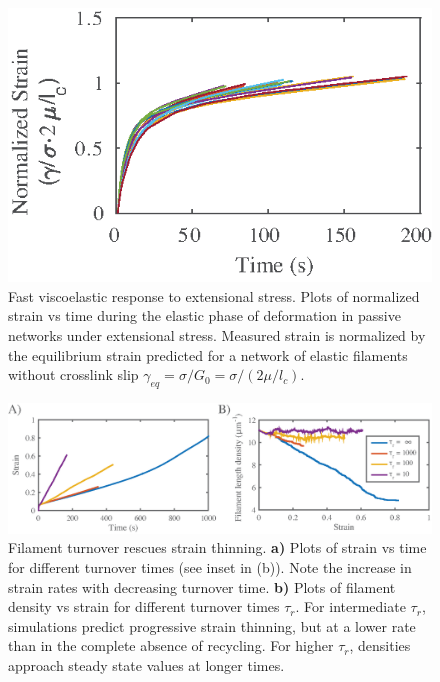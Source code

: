 \begin{figure}[h!]
	\centering
	\includegraphics[width=\hsize]{active/figures/FigS1}
	\caption{\label{fig:passive_supp}  Fast viscoelastic response to extensional stress. Plots of normalized strain vs time during the elastic phase of deformation in passive networks under extensional stress.  Measured strain is normalized by the equilibrium strain predicted for a network of elastic filaments without crosslink slip $\gamma_{eq} = \sigma/G_0 = \sigma/(2\mu/l_c)$.  }
\end{figure}

\begin{figure}[h!]
	\centering
	\includegraphics[width=\hsize]{active/figures/FigS2}
	\caption{\label{fig:thinning}  Filament turnover rescues strain thinning.  \textbf{a)} Plots of strain vs time for different turnover times (see inset in (b)). Note the increase in strain rates with decreasing turnover time. \textbf{b)} Plots of filament density vs strain for different turnover times $\tau_r$.  For intermediate $\tau_r$, simulations predict progressive strain thinning, but at a lower rate than in the complete absence of recycling. For higher $\tau_r$, densities approach steady state values at longer times.  }
\end{figure}

